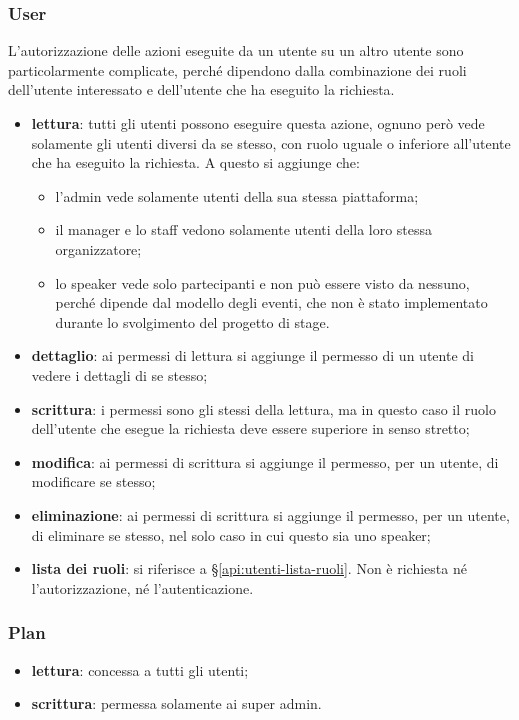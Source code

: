 \subsubsection{User}
L'autorizzazione delle azioni eseguite da un utente su un altro utente sono particolarmente complicate, perché dipendono dalla combinazione dei ruoli dell'utente interessato e dell'utente che ha eseguito la richiesta.
\begin{itemize}
	\item \textbf{lettura}: tutti gli utenti possono eseguire questa azione, ognuno però vede solamente gli utenti diversi da se stesso, con ruolo uguale o inferiore all'utente che ha eseguito la richiesta. A questo si aggiunge che:
	\begin{itemize}
		\item l'admin vede solamente utenti della sua stessa piattaforma;
		\item il manager e lo staff vedono solamente utenti della loro stessa organizzatore;
		\item lo speaker vede solo partecipanti e non può essere visto da nessuno, perché dipende dal modello degli eventi, che non è stato implementato durante lo svolgimento del progetto di stage.
	\end{itemize}
	\item \textbf{dettaglio}: ai permessi di lettura si aggiunge il permesso di un utente di vedere i dettagli di se stesso;
	\item \textbf{scrittura}: i permessi sono gli stessi della lettura, ma in questo caso il ruolo dell'utente che esegue la richiesta deve essere superiore in senso stretto;
	\item \textbf{modifica}: ai permessi di scrittura si aggiunge il permesso, per un utente, di modificare se stesso;
	\item \textbf{eliminazione}: ai permessi di scrittura si aggiunge il permesso, per un utente, di eliminare se stesso, nel solo caso in cui questo sia uno speaker;
	\item \textbf{lista dei ruoli}: si riferisce a \S \ref{api:utenti-lista-ruoli}. Non è richiesta né l'autorizzazione, né l'autenticazione.
\end{itemize}

\subsubsection{Plan}
\begin{itemize}
	\item \textbf{lettura}: concessa a tutti gli utenti;
	\item \textbf{scrittura}: permessa solamente ai super admin.
\end{itemize}

